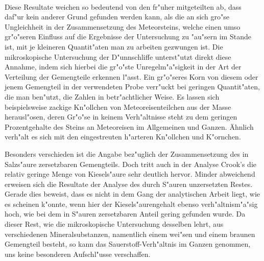 \documentclass[a4paper, 11pt, oneside]{article}
\begin{document}
\paragraph{}
Diese Resultate weichen so bedeutend von den fr"uher mitgeteilten ab, dass daf"ur kein anderer Grund gefunden werden kann, als die an sich gro"se Ungleichheit in der Zusammensetzung des Meteorsteins, welche einen umso gr"o"seren Einfluss auf die Ergebnisse der Untersuchung zu "au"sern im Stande ist, mit je kleineren Quantit"aten man zu arbeiten gezwungen ist. Die mikroskopische Untersuchung der D"unnschliffe unterst"utzt direkt diese Annahme, indem sich hierbei die gr"o"ste Unregelm"a"sigkeit in der Art der Verteilung der Gemengteile erkennen l"asst. Ein gr"o"seres Korn von diesem oder jenem Gemengteil in der verwendeten Probe verr"uckt bei geringen Quantit"aten, die man ben"utzt, die Zahlen in betr"achtlicher Weise. Es lassen sich beispielsweise zackige Kn"ollchen von Meteoreisenteilchen aus der Masse herausl"osen, deren Gr"o"se in keinem Verh"altnisse steht zu dem geringen Prozentgehalte des Steins an Meteoreisen im Allgemeinen und Ganzen. Ähnlich verh"alt es sich mit den eingestreuten h"arteren Kn"ollchen und K"ornchen.

Besonders verschieden ist die Angabe bez"uglich der Zusammensetzung des in Salzs"aure zersetzbaren Gemengteils. Doch tritt auch in der Analyse Crook's die relativ geringe Menge von Kiesels"aure sehr deutlich hervor. Minder abweichend erweisen sich die Resultate der Analyse des durch S"auren unzersetzten Restes. Gerade dies beweist, dass es nicht in dem Gang der analytischen Arbeit liegt, wie es scheinen k"onnte, wenn hier der Kiesels"aurengehalt ebenso verh"altnism"a"sig hoch, wie bei dem in S"auren zersetzbaren Anteil gering gefunden wurde. Da dieser Rest, wie die mikroskopische Untersuchung desselben lehrt, aus verschiedenen Mineralsubstanzen, namentlich einem wei"sen und einem braunen Gemengteil besteht, so kann das Sauerstoff-Verh"altnis im Ganzen genommen, uns keine besonderen Aufschl"usse verschaffen.
\end{document}
